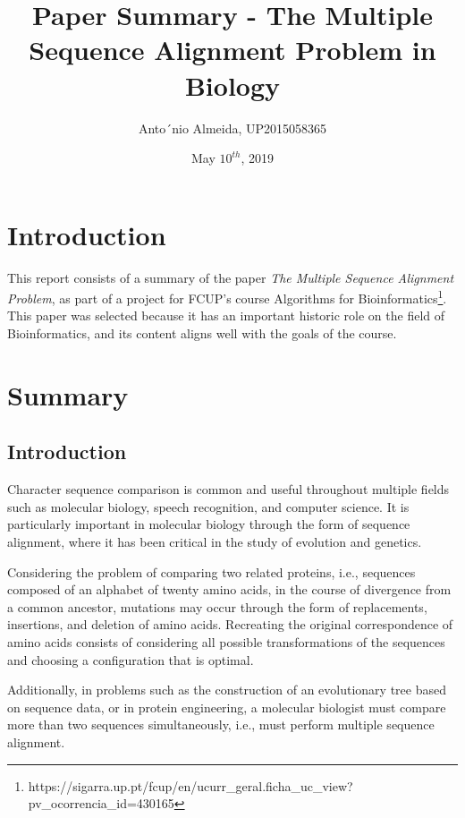 \documentclass[11pt]{article}
\begin{document}
\author{Anto´nio Almeida, UP2015058365}
\date{May $10^{th}$, 2019}
\title{Paper Summary - The Multiple Sequence Alignment Problem in Biology}
\maketitle



\section{Introduction}

This report consists of a summary of the paper \textit{The Multiple Sequence Alignment Problem}\cite{Carrillo:1988:MSA:53867.53874}, as part of a project for FCUP's course Algorithms for Bioinformatics\footnote{https://sigarra.up.pt/fcup/en/ucurr\_geral.ficha\_uc\_view?pv\_ocorrencia\_id=430165}. This paper was selected because it has an important historic role on the field of Bioinformatics, and its content aligns well with the goals of the course.

\section{Summary}

\subsection{Introduction}

Character sequence comparison is common and useful throughout multiple fields such as molecular biology, speech recognition, and computer science. It is particularly important in molecular biology through the form of sequence alignment, where it has been critical in the study of evolution and genetics. 

Considering the problem of comparing two related proteins, i.e., sequences composed of an alphabet of twenty amino acids, in the course of divergence from a common ancestor, mutations may occur through the form of replacements, insertions, and deletion of amino acids. Recreating the original correspondence of amino acids consists of considering all possible transformations of the sequences and choosing a configuration that is optimal. 

Additionally, in problems such as the construction of an evolutionary tree based on sequence data, or in protein engineering, a molecular biologist must compare more than two sequences simultaneously, i.e., must perform multiple sequence alignment.
\end{document}
